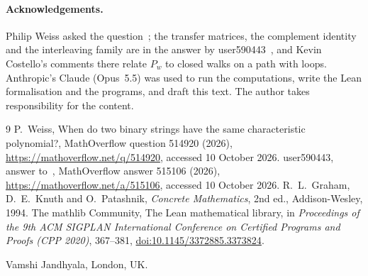 \documentclass[11pt]{article}
\theoremstyle{remark}
\begin{document}
\paragraph{Acknowledgements.} Philip Weiss asked the question~\cite{MO}; the transfer matrices, the complement
identity and the interleaving family are in the answer by user590443~\cite{MOans}, and Kevin Costello's comments
there relate $P_w$ to closed walks on a path with loops. Anthropic's Claude (Opus~5.5) was used to run the
computations, write the Lean formalisation and the programs, and draft this text. The author takes responsibility for
the content.

\begin{thebibliography}{9}
 P.~Weiss, When do two binary strings have the same characteristic polynomial?, MathOverflow question
514920 (2026), \url{https://mathoverflow.net/q/514920}, accessed 10 October 2026.
 user590443, answer to~\cite{MO}, MathOverflow answer 515106 (2026),
\url{https://mathoverflow.net/a/515106}, accessed 10 October 2026.
 R.~L.~Graham, D.~E.~Knuth and O.~Patashnik, \emph{Concrete Mathematics}, 2nd ed., Addison-Wesley,
1994.
 The mathlib Community, The Lean mathematical library, in \emph{Proceedings of the 9th ACM
SIGPLAN International Conference on Certified Programs and Proofs (CPP 2020)}, 367--381,
\href{https://doi.org/10.1145/3372885.3373824}{doi:10.1145/3372885.3373824}.
\end{thebibliography}

\bigskip
\noindent Vamshi Jandhyala, London, UK.
\end{document}
